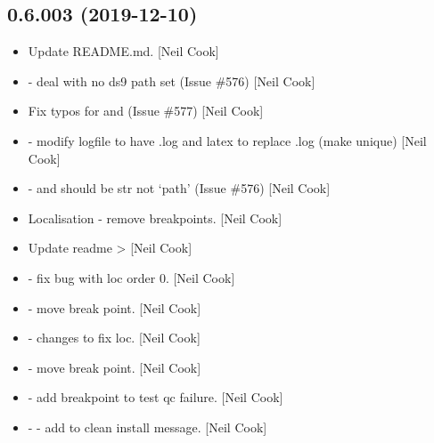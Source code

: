 \documentclass[a4paper,10pt,english]{report}
\begin{document}
\subsection{0.6.003 (2019-12-10)}
\label{\detokenize{misc/changelog:id16}}\begin{itemize}
\item {} 
Update README.md. {[}Neil Cook{]}

\item {} 
 - deal with no ds9 path set
(Issue \#576) {[}Neil Cook{]}

\item {} 
Fix typos for  and  (Issue \#577) {[}Neil Cook{]}

\item {} 
 - modify logfile to have .log
and latex to replace .log (make unique) {[}Neil Cook{]}

\item {} 
 -  and
 should be str not ‘path’ (Issue \#576) {[}Neil Cook{]}

\item {} 
Localisation - remove breakpoints. {[}Neil Cook{]}

\item {} 
Update readme  \textendash{}\textgreater{}  {[}Neil Cook{]}

\item {} 
 - fix bug with loc order 0. {[}Neil Cook{]}

\item {} 
 - move break point. {[}Neil Cook{]}

\item {} 
 - changes to fix loc. {[}Neil Cook{]}

\item {} 
 - move break point. {[}Neil Cook{]}

\item {} 
 - add breakpoint to test qc failure. {[}Neil Cook{]}

\item {} 
 -  - add to clean install
message. {[}Neil Cook{]}


\end{itemize}
\end{document}
